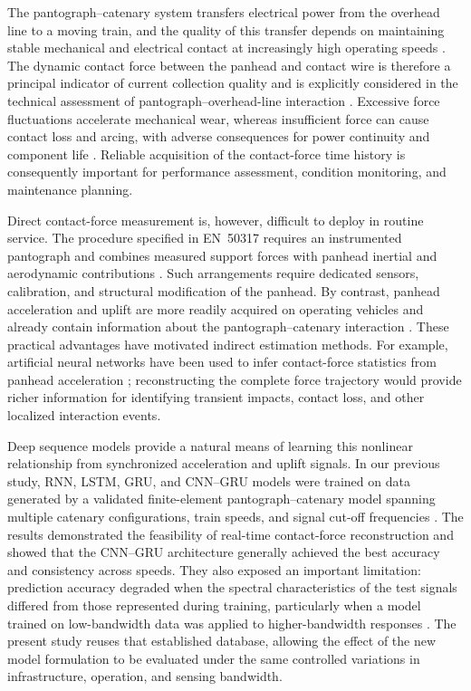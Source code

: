 \documentclass[journal,twoside]{IEEEtran}
\begin{document}
The pantograph--catenary system transfers electrical power from the overhead line to a moving train, and the quality of this transfer depends on maintaining stable mechanical and electrical contact at increasingly high operating speeds \cite{liu2024review,bruni2018interaction}. The dynamic contact force between the panhead and contact wire is therefore a principal indicator of current collection quality and is explicitly considered in the technical assessment of pantograph--overhead-line interaction \cite{en50367_2020,navik2017variation}. Excessive force fluctuations accelerate mechanical wear, whereas insufficient force can cause contact loss and arcing, with adverse consequences for power continuity and component life \cite{bruni2018interaction}. Reliable acquisition of the contact-force time history is consequently important for performance assessment, condition monitoring, and maintenance planning.

Direct contact-force measurement is, however, difficult to deploy in routine service. The procedure specified in EN~50317 requires an instrumented pantograph and combines measured support forces with panhead inertial and aerodynamic contributions \cite{en50317_2012}. Such arrangements require dedicated sensors, calibration, and structural modification of the panhead. By contrast, panhead acceleration and uplift are more readily acquired on operating vehicles and already contain information about the pantograph--catenary interaction \cite{carnevale2016processing,blanco2022panhead}. These practical advantages have motivated indirect estimation methods. For example, artificial neural networks have been used to infer contact-force statistics from panhead acceleration \cite{gregori2023assessment}; reconstructing the complete force trajectory would provide richer information for identifying transient impacts, contact loss, and other localized interaction events.

Deep sequence models provide a natural means of learning this nonlinear relationship from synchronized acceleration and uplift signals. In our previous study, RNN, LSTM, GRU, and CNN--GRU models were trained on data generated by a validated finite-element pantograph--catenary model spanning multiple catenary configurations, train speeds, and signal cut-off frequencies \cite{ale2026realtime}. The results demonstrated the feasibility of real-time contact-force reconstruction and showed that the CNN--GRU architecture generally achieved the best accuracy and consistency across speeds. They also exposed an important limitation: prediction accuracy degraded when the spectral characteristics of the test signals differed from those represented during training, particularly when a model trained on low-bandwidth data was applied to higher-bandwidth responses \cite{ale2026realtime}. The present study reuses that established database, allowing the effect of the new model formulation to be evaluated under the same controlled variations in infrastructure, operation, and sensing bandwidth.
\end{document}
